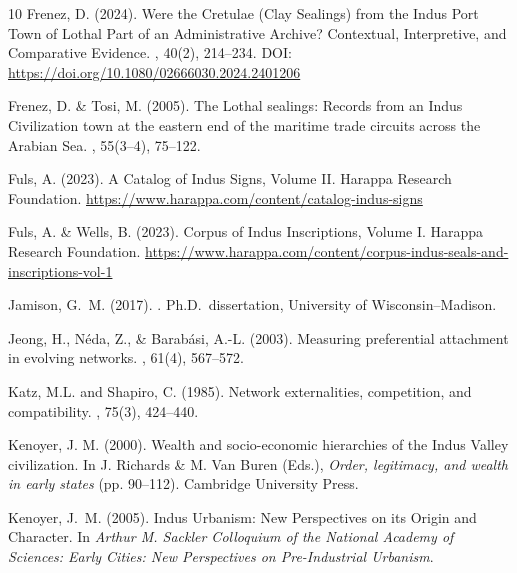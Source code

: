 \documentclass[12pt]{article}
\begin{document}
\begin{thebibliography}{10}
Frenez, D. (2024).
\newblock Were the Cretulae (Clay Sealings) from the {I}ndus Port Town of Lothal Part of an
Administrative Archive? Contextual, Interpretive, and Comparative Evidence.
, 40(2), 214--234.
\newblock DOI: \url{https://doi.org/10.1080/02666030.2024.2401206}

Frenez, D. \& Tosi, M. (2005).
\newblock The {L}othal sealings: {R}ecords from an {I}ndus {C}ivilization town at the eastern
end of the maritime trade circuits across the {A}rabian {S}ea.
, 55(3--4), 75--122.

Fuls, A. (2023).
\newblock A {C}atalog of {I}ndus {S}igns, {V}olume {II}.
\newblock Harappa Research Foundation.
\newblock \url{https://www.harappa.com/content/catalog-indus-signs}

Fuls, A. \& Wells, B. (2023).
\newblock Corpus of {I}ndus {I}nscriptions, {V}olume {I}.
\newblock Harappa Research Foundation.
\newblock \url{https://www.harappa.com/content/corpus-indus-seals-and-inscriptions-vol-1}

Jamison, G.~M. (2017).
.
\newblock Ph.D.\ dissertation, University of Wisconsin--Madison.

Jeong, H., N{\'e}da, Z., \& Barab{\'a}si, A.-L. (2003).
\newblock Measuring preferential attachment in evolving networks.
, 61(4), 567--572.

Katz, M.L. and Shapiro, C. (1985).
\newblock Network externalities, competition, and compatibility.
, 75(3), 424--440.

Kenoyer, J. M. (2000).
\newblock Wealth and socio-economic hierarchies of the {I}ndus {V}alley civilization.
\newblock In J. Richards \& M. Van Buren (Eds.), {\em Order, legitimacy, and wealth in early states} (pp. 90--112).
\newblock Cambridge University Press.

Kenoyer, J.~M. (2005).
\newblock Indus Urbanism: {N}ew {P}erspectives on its {O}rigin and {C}haracter.
\newblock In {\em Arthur M. Sackler Colloquium of the National Academy of Sciences: Early Cities: New Perspectives on Pre-Industrial Urbanism}.


\end{thebibliography}
\end{document}
